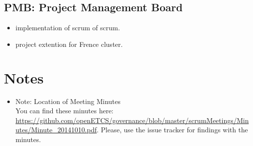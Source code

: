 \documentclass[a4paper, 11pt]{article}
\begin{document}
\subsection{PMB: Project Management Board}
\begin{itemize}

\item implementation of scrum of scrum.\\
\item project extention for Frence cluster.\\

\end{itemize}

\section{Notes}
\begin{itemize}

\item Note: Location of Meeting Minutes\\
You can find these minutes here: \url{https://github.com/openETCS/governance/blob/master/scrumMeetings/Minutes/Minute_20141010.pdf}. Please, use the issue tracker for findings with the minutes.

\end{itemize}
\end{document}

